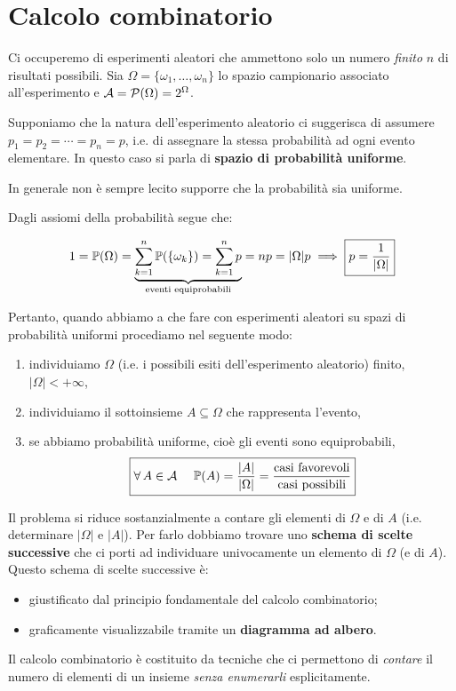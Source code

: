 
\chapter{Calcolo combinatorio}

\ParteEsercizi

Ci occuperemo di esperimenti aleatori che ammettono solo un numero \textit{finito} $n$ di risultati possibili. Sia $\Omega =\{\omega_{1} ,\dots ,\omega_{n}\}$ lo spazio campionario associato all'esperimento e $\mathcal{A} =\mathcal{P}(\Omega) =2^{\Omega }$.

Supponiamo che la natura dell'esperimento aleatorio ci suggerisca di assumere $p_{1} =p_{2} =\cdots =p_{n} =p$, i.e. di assegnare la stessa probabilità ad ogni evento elementare. In questo caso si parla di \textbf{spazio di probabilità uniforme}.

\begin{rem}
	In generale non è sempre lecito supporre che la probabilità sia uniforme.
\end{rem}

Dagli assiomi della probabilità segue che:

\begin{equation*}
	1=\mathbb{P}(\Omega) =\underbrace{\sum\limits_{k=1}^{n}\mathbb{P}(\{\omega_{k}\}) =\sum\limits_{k=1}^{n} p}_{\text{eventi equiprobabili}} =np=|\Omega| p\implies \boxed{p=\frac{1}{|\Omega| }}
\end{equation*}

Pertanto, quando abbiamo a che fare con esperimenti aleatori su spazi di probabilità uniformi procediamo nel seguente modo:
\begin{enumerate}
	\item individuiamo $\Omega $ (i.e. i possibili esiti dell'esperimento aleatorio) finito, $|\Omega| < +\infty$,
	\item individuiamo il sottoinsieme $A\subseteq \Omega $ che rappresenta l'evento,
	\item se abbiamo probabilità uniforme, cioè gli eventi sono equiprobabili,
	\begin{equation*}
		\boxed{\forall A\in \Ac \ \ \ \ \PP(A) =\frac{| A| }{|\Omega| } =\frac{\text{casi favorevoli}}{\text{casi possibili}}}
	\end{equation*}
\end{enumerate}
Il problema si riduce sostanzialmente a contare gli elementi di $\Omega $ e di $A$ (i.e. determinare $|\Omega| $ e $|A| $). Per farlo dobbiamo trovare uno \textbf{schema di scelte successive} che ci porti ad individuare univocamente un elemento di $\Omega $ (e di $A$). Questo schema di scelte successive è:
\begin{itemize}
	\item giustificato dal principio fondamentale del calcolo combinatorio;
	\item graficamente visualizzabile tramite un \textbf{diagramma ad albero}.
\end{itemize}
Il calcolo combinatorio è costituito da tecniche che ci permettono di \textit{contare} il numero di elementi di un insieme \textit{senza enumerarli} esplicitamente.

